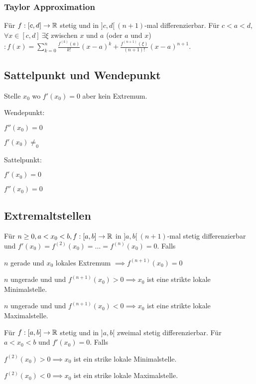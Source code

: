 \subsubsection{Taylor Approximation}
Für $f:[c,d] \to \mathbb{R}$ stetig und in $]c, d[ \ (n+1)$-mal differenzierbar. Für $c < a < d$, $\forall x \in [c, d] \ \exists \xi$ zwischen $x$ und $a$ (oder $a$ und $x$)$: f(x) = \sum_{k=0}^{n} \frac{f^{(k)}(a)}{k!}(x-a)^k + \frac{f^{(n+1)}(\xi)}{(n+1)!}(x-a)^{n+1}$.

\subsection{Sattelpunkt und Wendepunkt}
Stelle $x_0$ wo $f'(x_0)=0$ aber kein Extremum.
\begin{compactdesc}
    \item[Wendepunkt:]
        \begin{inparaitem}
            \item $f''(x_0)=0$
            \item $f'(x_0)\neq_0$
        \end{inparaitem}
    \item[Sattelpunkt:]
        \begin{inparaitem}
            \item $f'(x_0) = 0$
            \item $f''(x_0) = 0$
        \end{inparaitem}
\end{compactdesc}

\subsection{Extremaltstellen}
Für $n \ge 0, a < x_0 < b, f:[a,b] \to \mathbb{R}$ in $]a,b[ \ (n+1)$-mal stetig differenzierbar und $f'(x_0) = f^{(2)}(x_0) = \dots = f^{(n)}(x_0) = 0$. Falls
\begin{compactenum}
    \item $n$ gerade und $x_0$ lokales Extremum $\implies f^{(n+1)}(x_0) = 0$
    \item $n$ ungerade und und $f^{(n+1)}(x_0) > 0 \implies x_0$ ist eine strikte lokale Minimalstelle.
    \item $n$ ungerade und und $f^{(n+1)}(x_0) < 0 \implies x_0$ ist eine strikte lokale Maximalstelle.
\end{compactenum}

Für $f:[a,b] \to \mathbb{R}$ stetig und in $]a,b[$ zweimal stetig differenzierbar. Für $a < x_0 < b$ und $f'(x_0) = 0$. Falls
\begin{compactenum}
    \item $f^{(2)}(x_0) > 0 \implies x_0$ ist ein strike lokale Minimalstelle.
    \item $f^{(2)}(x_0) < 0 \implies x_0$ ist ein strike lokale Maximalstelle.
\end{compactenum}

